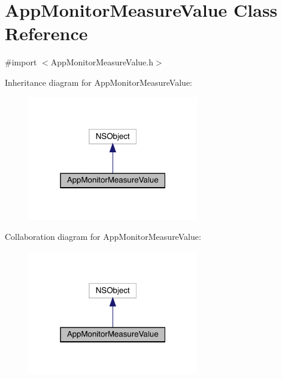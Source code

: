 \hypertarget{interface_app_monitor_measure_value}{}\section{App\+Monitor\+Measure\+Value Class Reference}
\label{interface_app_monitor_measure_value}


{\ttfamily \#import $<$App\+Monitor\+Measure\+Value.\+h$>$}



Inheritance diagram for App\+Monitor\+Measure\+Value\+:\nopagebreak
\begin{figure}[H]
\begin{center}
\leavevmode
\includegraphics[width=211pt]{interface_app_monitor_measure_value__inherit__graph}
\end{center}
\end{figure}


Collaboration diagram for App\+Monitor\+Measure\+Value\+:\nopagebreak
\begin{figure}[H]
\begin{center}
\leavevmode
\includegraphics[width=211pt]{interface_app_monitor_measure_value__coll__graph}
\end{center}
\end{figure}
